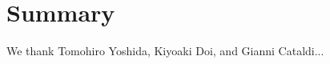 \documentclass[linenumbers, twocolumn, twocolappendix, astrosymb, times]{aastex631}
\begin{document}




\section{Summary} \label{sec:summary}


\begin{acknowledgments}
We thank Tomohiro Yoshida, Kiyoaki Doi, and Gianni Cataldi...
\end{acknowledgments}

%

\vspace{5mm}




\end{document}
